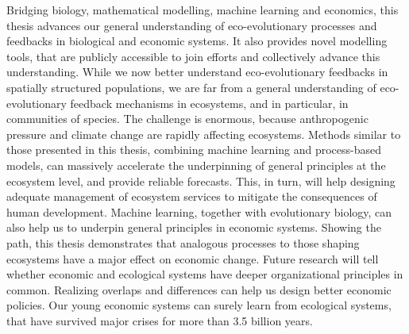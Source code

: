 Bridging biology, mathematical modelling, machine learning and economics, this thesis advances our general understanding of eco-evolutionary processes and feedbacks in biological and economic systems. It also provides novel modelling tools, that are publicly accessible to join efforts and collectively advance this understanding.
% 
While we now better understand eco-evolutionary feedbacks in spatially structured populations, we are far from a general understanding of eco-evolutionary feedback mechanisms in ecosystems, and in particular, in communities of species. 
% 
The challenge is enormous, because anthropogenic pressure and climate change are rapidly affecting ecosystems.
% 
Methods similar to those presented in this thesis, combining machine learning and process-based models, can massively accelerate the underpinning of general principles at the ecosystem level, and provide reliable forecasts. This, in turn, will help designing adequate management of ecosystem services to mitigate the consequences of human development.
% 
Machine learning, together with evolutionary biology, can also help us to underpin general principles in economic systems. Showing the path, this thesis demonstrates that analogous processes to those shaping ecosystems have a major effect on economic change. Future research will tell whether economic and ecological systems have deeper organizational principles in common.
% 
% 
Realizing overlaps and differences can help us design better economic policies. 
% 
Our young economic systems can surely learn from ecological systems, that have survived major crises for more than 3.5 billion years.









% 


